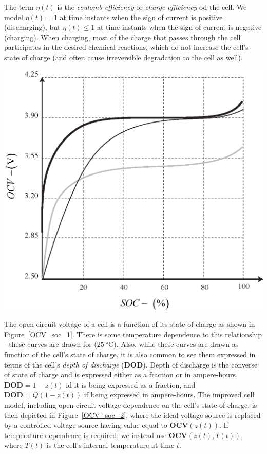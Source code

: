 \documentclass[11pt,a4paper,oneside]{book}
\numberwithin{equation}{section}
\theoremstyle{it}
\theoremstyle{definition}
\begin{document}
The term $\eta(t)$ is the \textit{coulomb efficiency} or \textit{charge efficiency} od the cell. We model $\eta(t) = 1$ at time instants when the sign of current is positive (discharging), but $\eta(t)\le 1$ at time instants when the sign of current is negative (charging). When charging, most of the charge that passes through the cell participates in the desired chemical reactions, which do not increase the cell's state of charge (and often cause irreversible degradation to the cell as well).
\vfill%
\noindent
\begin{minipage}{0.4\textwidth}%
	\includegraphics[width=\linewidth]{figures/lithium_ion_battery/OCV_soc_1.eps}
	\label{OCV_soc_1}
\end{minipage}%
\hfill%
\begin{minipage}{0.55\textwidth}
	The open circuit voltage of a cell is a function of its state of charge as 
	shown in Figure~\ref{OCV_soc_1}. There is some temperature dependence to 
	this relationship - these curves are drawn for  
	($\SI{25}{\celsius}$). Also, while these curves are drawn as function of 
	the cell's state of charge, it is also common to see them expressed in 
	terms of the cell's \textit{depth of discharge} ($\mathbf{DOD}$). Depth of 
	discharge is the converse of state of charge and is expressed either as a 
	fraction or in ampere-hours. $\mathbf{DOD}=1-z(t)$ id it is being expressed 
	as a fraction, and $\mathbf{DOD}=Q(1-z(t))$ if being  expressed in 
	ampere-hours. The improved cell model, including open-circuit-voltage 
	dependence on the cell's state of charge, is then depicted in 
	Figure~\ref{OCV_soc_2}, where the ideal voltage source is replaced by a 
	controlled voltage source having value equal to $\mathbf{OCV}(z(t))$. If 
	temperature dependence is required, we instead use 
	$\mathbf{OCV}(z(t),T(t))$, where $T(t)$ is the cell's internal temperature 
	at time $t$.
\end{minipage}
\end{document}
